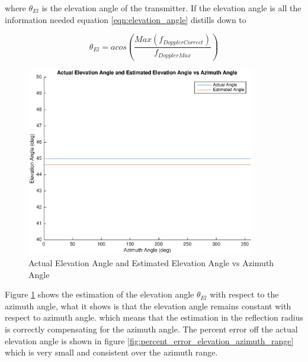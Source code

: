 where $\theta_{El}$ is the elevation angle of the transmitter. If the elevation angle is all the information needed equation \ref{eqn:elevation_angle} distills down to

\begin{equation}
	\theta_{El} = acos\left(\frac{Max(f_{DopplerCorrect})}{f_{DopplerMax}}\right)
	\label{eqn:elevation_angle_only}
\end{equation}

\begin{figure}
	\begin{center}
		\includegraphics[width=10cm]{images/results/Elevation_angle_comparason_Azimuth_range.eps}
		\caption{Actual Elevation Angle and Estimated Elevation Angle vs Azimuth Angle}
		\label{fig:elevation_comparason_azimuth_range}
	\end{center}
\end{figure}

Figure \ref{fig:elevation_comparason_azimuth_range} shows the estimation of the elevation angle $\theta_{El}$ with respect to the azimuth angle, what it shows is that the elevation angle remains constant with respect to azimuth angle. which means that the estimation in the reflection radius is correctly compensating for the azimuth angle. The percent error off the actual elevation angle is shown in figure \ref{fig:percent_error_elevation_azimuth_range} which is very small and consistent over the azimuth range.

